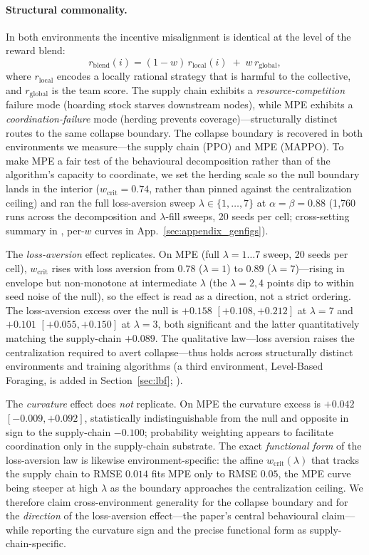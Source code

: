 \documentclass[letterpaper]{article}
\theoremstyle{plain}
\newcommand{\wcrit}{w_{\mathrm{crit}}}
\begin{document}
\paragraph{Structural commonality.}
In both environments the incentive misalignment is identical at the level of the
reward blend:
\begin{equation}
  r_{\text{blend}}(i) = (1-w)\,r_{\text{local}}(i) \;+\; w\,r_{\text{global}},
\end{equation}
where $r_{\text{local}}$ encodes a locally rational strategy that is harmful to
the collective, and $r_{\text{global}}$ is the team score. The supply chain
exhibits a \emph{resource-competition} failure mode (hoarding stock starves
downstream nodes), while MPE exhibits a \emph{coordination-failure} mode (herding
prevents coverage)---structurally distinct routes to the same collapse boundary.
The collapse boundary is recovered in both environments we measure---the supply
chain (PPO) and MPE (MAPPO). To make MPE a fair test of the behavioural
decomposition rather than of the algorithm's capacity to coordinate, we set the
herding scale so the null boundary lands in the interior ($\wcrit{=}0.74$, rather
than pinned against the centralization ceiling) and ran the full loss-aversion
sweep $\lambda\in\{1,\ldots,7\}$ at $\alpha{=}\beta{=}0.88$ (1{,}760 runs across
the decomposition and $\lambda$-fill sweeps, 20 seeds per cell;
cross-setting summary in , per-$w$ curves in
App.~\ref{sec:appendix_genfigs}).

The \emph{loss-aversion} effect replicates. On MPE (full $\lambda{=}1{\ldots}7$
sweep, 20 seeds per cell), $\wcrit$ rises with loss aversion from $0.78$
($\lambda{=}1$) to $0.89$ ($\lambda{=}7$)---rising in envelope but non-monotone at
intermediate $\lambda$ (the $\lambda{=}2,4$ points dip to within seed noise of the
null), so the effect is read as a direction, not a strict ordering. The
loss-aversion excess over the null is $+0.158$ $[+0.108, +0.212]$ at
$\lambda{=}7$ and $+0.101$ $[+0.055, +0.150]$ at $\lambda{=}3$, both significant
and the latter quantitatively matching the supply-chain $+0.089$. The
qualitative law---loss aversion raises the centralization required to avert
collapse---thus holds across structurally distinct environments and training
algorithms (a third environment, Level-Based Foraging, is added in
Section~\ref{sec:lbf}; ).

The \emph{curvature} effect does \emph{not} replicate. On MPE the curvature
excess is $+0.042$ $[-0.009, +0.092]$, statistically indistinguishable from the
null and opposite in sign to the supply-chain $-0.100$; probability weighting
appears to facilitate coordination only in the supply-chain substrate. The exact
\emph{functional form} of the loss-aversion law is likewise environment-specific:
the affine $\wcrit(\lambda)$ that tracks the supply chain to RMSE $0.014$ fits MPE
only to RMSE $0.05$, the MPE curve being steeper at high $\lambda$ as the boundary
approaches the centralization ceiling. We therefore claim cross-environment
generality for the collapse boundary and for the \emph{direction} of the
loss-aversion effect---the paper's central behavioural claim---while reporting the
curvature sign and the precise functional form as supply-chain-specific.
\end{document}
